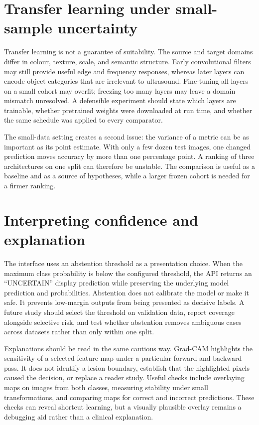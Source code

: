 \section{Transfer learning under small-sample uncertainty}
Transfer learning is not a guarantee of suitability. The source and target domains differ in colour, texture, scale, and semantic structure. Early convolutional filters may still provide useful edge and frequency responses, whereas later layers can encode object categories that are irrelevant to ultrasound. Fine-tuning all layers on a small cohort may overfit; freezing too many layers may leave a domain mismatch unresolved. A defensible experiment should state which layers are trainable, whether pretrained weights were downloaded at run time, and whether the same schedule was applied to every comparator.

The small-data setting creates a second issue: the variance of a metric can be as important as its point estimate. With only a few dozen test images, one changed prediction moves accuracy by more than one percentage point. A ranking of three architectures on one split can therefore be unstable. The comparison is useful as a baseline and as a source of hypotheses, while a larger frozen cohort is needed for a firmer ranking.

\section{Interpreting confidence and explanation}
The interface uses an abstention threshold as a presentation choice. When the maximum class probability is below the configured threshold, the API returns an ``UNCERTAIN'' display prediction while preserving the underlying model prediction and probabilities. Abstention does not calibrate the model or make it safe. It prevents low-margin outputs from being presented as decisive labels. A future study should select the threshold on validation data, report coverage alongside selective risk, and test whether abstention removes ambiguous cases across datasets rather than only within one split.

Explanations should be read in the same cautious way. Grad-CAM highlights the sensitivity of a selected feature map under a particular forward and backward pass. It does not identify a lesion boundary, establish that the highlighted pixels caused the decision, or replace a reader study. Useful checks include overlaying maps on images from both classes, measuring stability under small transformations, and comparing maps for correct and incorrect predictions. These checks can reveal shortcut learning, but a visually plausible overlay remains a debugging aid rather than a clinical explanation.

